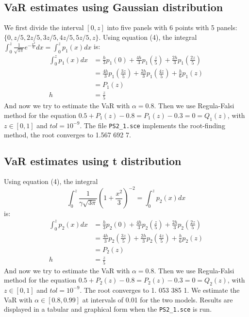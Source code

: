 \documentclass[10pt, twocolumn]{article}
\begin{document}
		\subsection{VaR estimates using Gaussian distribution}
		We first divide the interval $[0, z]$ into five panels with 6 points with 5 panels: $\{0, z/5, 2z/5, 3z/5, 4z/5, 5z/5, z\}$.
		Using equation (4), the integral $\int_{0}^{z}\frac{1}{\sqrt{1\pi}}e^{-\frac{x^2}{6}}dx = \int_{0}^{z}p_1(x)dx$ is:
		$$
		\begin{aligned}
			\int_{0}^{z}p_1(x)dx &= \frac{h}{3}p_1(0) + \frac{4h}{3}p_1\left(\frac{z}{5}\right) + \frac{2h}{3}p_1\left(\frac{2z}{5}\right)\\
				&= \frac{4h}{3}p_1\left(\frac{3z}{5}\right) + \frac{2h}{3}p_1\left(\frac{4z}{5}\right) + \frac{h}{6}p_1(z)\\
				&= P_1(z)\\
				h &= \frac{z}{5}
		\end{aligned}
		$$
		And now we try to estimate the VaR with $\alpha=0.8$.
		Then we use Regula-Falsi method for the equation $0.5 + P_1(z) - 0.8 = P_1(z)-0.3=0=Q_1(z)$, with $z\in[0,1]$ and $tol=10^{-9}$.
		The file \texttt{PS2\_1.sce} implements the root-finding method, the root converges to 1.567 692 7.
		
		\subsection{VaR estimates using t distribution}
		Using equation (4), the integral $$\int_{0}^{z}\frac{1}{\gamma\sqrt{3\pi}}\left(1+\frac{x^2}{3}\right)^{-2} = \int_{0}^{z}p_2(x)dx$$ is:
		$$
		\begin{aligned}
			\int_{0}^{z}p_2(x)dx &= \frac{h}{3}p_2(0) + \frac{4h}{3}p_2\left(\frac{z}{5}\right) + \frac{2h}{3}p_2\left(\frac{2z}{5}\right)\\
				&= \frac{4h}{3}p_2\left(\frac{3z}{5}\right) + \frac{2h}{3}p_2\left(\frac{4z}{5}\right) + \frac{h}{6}p_2(z)\\
				&= P_2(z)\\
				h &= \frac{z}{5}
		\end{aligned}
		$$
		And now we try to estimate the VaR with $\alpha=0.8$.
		Then we use Regula-Falsi method for the equation $0.5 + P_2(z) - 0.8 = P_2(z)-0.3=0=Q_2(z)$, with $z\in[0,1]$ and $tol=10^{-9}$.
		The root converges to 1. 053 385 1.
		We estimate the VaR with $\alpha\in[0.8, 0.99]$ at intervals of 0.01 for the two models.
		Results are displayed in a tabular and graphical form when the \texttt{PS2\_1.sce} is run.
		
\end{document}
